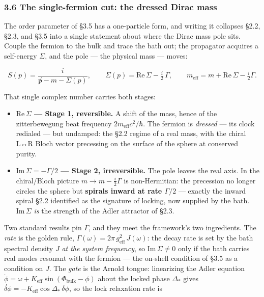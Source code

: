 \documentclass[
]{article}
\providecommand{\tightlist}{%
  \setlength{\itemsep}{0pt}\setlength{\parskip}{0pt}}
\begin{document}
\subsubsection{3.6 The single-fermion cut: the dressed Dirac
mass}\label{the-single-fermion-cut-the-dressed-dirac-mass}

The order parameter of §3.5 has a one-particle form, and writing it
collapses §2.2, §2.3, and §3.5 into a single statement about where the
Dirac mass pole sits. Couple the fermion to the bulk and trace the bath
out; the propagator acquires a self-energy \(\Sigma\), and the pole ---
the physical mass --- moves:

\[S(p) = \frac{i}{\not p - m - \Sigma(p)}, \qquad \Sigma(p) = \mathrm{Re}\,\Sigma - \tfrac{i}{2}\,\Gamma, \qquad m_{\text{eff}} = m + \mathrm{Re}\,\Sigma - \tfrac{i}{2}\Gamma.\]

That single complex number carries both stages:

\begin{itemize}
\tightlist
\item
  \textbf{\(\mathrm{Re}\,\Sigma\) --- Stage 1, reversible.} A shift of
  the mass, hence of the zitterbewegung beat frequency
  \(2m_{\text{eff}}c^2/\hbar\). The fermion is \emph{dressed} --- its
  clock redialed --- but undamped: the §2.2 regime of a real mass, with
  the chiral L↔R Bloch vector precessing on the surface of the sphere at
  conserved purity.
\item
  \textbf{\(\mathrm{Im}\,\Sigma = -\Gamma/2\) --- Stage 2,
  irreversible.} The pole leaves the real axis. In the chiral/Bloch
  picture \(m\to m-\tfrac{i}{2}\Gamma\) is non-Hermitian: the precession
  no longer circles the sphere but \textbf{spirals inward at rate
  \(\Gamma/2\)} --- exactly the inward spiral §2.2 identified as the
  signature of locking, now supplied by the bath.
  \(\mathrm{Im}\,\Sigma\) \emph{is} the strength of the Adler attractor
  of §2.3.
\end{itemize}

Two standard results pin \(\Gamma\), and they meet the framework's two
ingredients. The \emph{rate} is the golden rule,
\(\Gamma(\omega) = 2\pi\,g_{\text{eff}}^2\,J(\omega)\): the decay rate
is set by the bath spectral density \(J\) \emph{at the system
frequency}, so \(\mathrm{Im}\,\Sigma\neq 0\) only if the bath carries
real modes resonant with the fermion --- the on-shell condition of §3.5
as a condition on \(J\). The \emph{gate} is the Arnold tongue:
linearizing the Adler equation
\(\dot\phi=\omega+K_{\text{eff}}\sin(\Phi_{\text{bulk}}-\phi)\) about
the locked phase \(\Delta_*\) gives
\(\dot{\delta\phi}=-K_{\text{eff}}\cos\Delta_*\,\delta\phi\), so the
lock relaxation rate is
\end{document}
